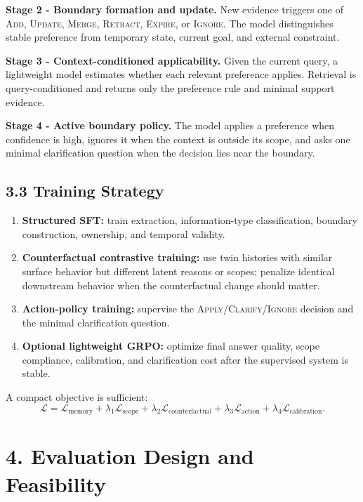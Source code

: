 \documentclass[10.5pt,a4paper]{article}
\begin{document}
\textbf{Stage 2 - Boundary formation and update.} New evidence triggers one of \textsc{Add}, \textsc{Update}, \textsc{Merge}, \textsc{Retract}, \textsc{Expire}, or \textsc{Ignore}. The model distinguishes stable preference from temporary state, current goal, and external constraint.

\textbf{Stage 3 - Context-conditioned applicability.} Given the current query, a lightweight model estimates whether each relevant preference applies. Retrieval is query-conditioned and returns only the preference rule and minimal support evidence.

\textbf{Stage 4 - Active boundary policy.} The model applies a preference when confidence is high, ignores it when the context is outside its scope, and asks one minimal clarification question when the decision lies near the boundary.

\subsection{3.3 Training Strategy}
\begin{enumerate}
  \item \textbf{Structured SFT:} train extraction, information-type classification, boundary construction, ownership, and temporal validity.
  \item \textbf{Counterfactual contrastive training:} use twin histories with similar surface behavior but different latent reasons or scopes; penalize identical downstream behavior when the counterfactual change should matter.
  \item \textbf{Action-policy training:} supervise the \textsc{Apply}/\textsc{Clarify}/\textsc{Ignore} decision and the minimal clarification question.
  \item \textbf{Optional lightweight GRPO:} optimize final answer quality, scope compliance, calibration, and clarification cost after the supervised system is stable.
\end{enumerate}

A compact objective is sufficient:
\[
\mathcal{L}=\mathcal{L}_{\mathrm{memory}}+\lambda_1\mathcal{L}_{\mathrm{scope}}+
\lambda_2\mathcal{L}_{\mathrm{counterfactual}}+\lambda_3\mathcal{L}_{\mathrm{action}}+
\lambda_4\mathcal{L}_{\mathrm{calibration}}.
\]

\section{4. Evaluation Design and Feasibility}
\end{document}
